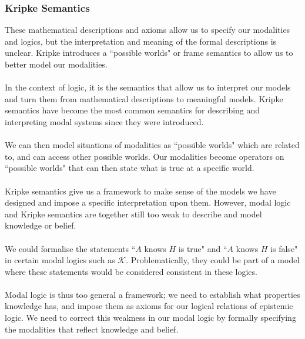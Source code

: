 \documentclass[12pt, a4paper, twoside]{article}
\begin{document}
\subsubsection{Kripke Semantics}\label{epistemic_kripke}
These mathematical descriptions and axioms allow us to specify our modalities
and logics, but the interpretation and meaning of the formal descriptions is
unclear.
Kripke introduces a ``possible worlds" or frame semantics to allow us to better
model our modalities. \citep{blackburn2002modal} \\
\\
In the context of logic, it is the semantics that allow us to interpret our
models and turn them from mathematical descriptions to meaningful models.
Kripke semantics have become the most common semantics for describing and
interpreting modal systems since they were introduced.\\
\\
We can then model situations of modalities as ``possible worlds" which are
related to, and can access other possible worlds.
Our modalities become operators on ``possible worlds" that can then state what
is true at a specific world.\\
\\
Kripke semantics give us a framework to make sense of the models we have
designed and impose a specific interpretation upon them.
However, modal logic and Kripke semantics are together still too weak to
describe and model knowledge or belief.\\
\\
We could formalise the statements ``$A$ knows $H$ is true" and ``$A$ knows $H$
is false" in certain modal logics such as $\mathcal{K}$.
Problematically, they could be part of a model where these statements would be
considered consistent in these logics.\\
\\
Modal logic is thus too general a framework; we need to establish what
properties knowledge has, and impose them as axioms for our logical relations of
epistemic logic.
We need to correct this weakness in our modal logic by formally specifying the
modalities that reflect knowledge and belief.
\end{document}
